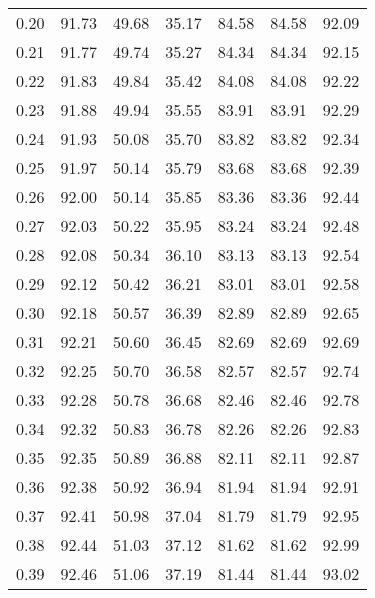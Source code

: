 \begin{tabular}{|c|c|c|c|c|c|c|}
      0.20 &     91.73 &     49.68 &      35.17 &   84.58 &      84.58 &         92.09 \\
      0.21 &     91.77 &     49.74 &      35.27 &   84.34 &      84.34 &         92.15 \\
      0.22 &     91.83 &     49.84 &      35.42 &   84.08 &      84.08 &         92.22 \\
      0.23 &     91.88 &     49.94 &      35.55 &   83.91 &      83.91 &         92.29 \\
      0.24 &     91.93 &     50.08 &      35.70 &   83.82 &      83.82 &         92.34 \\
      0.25 &     91.97 &     50.14 &      35.79 &   83.68 &      83.68 &         92.39 \\
      0.26 &     92.00 &     50.14 &      35.85 &   83.36 &      83.36 &         92.44 \\
      0.27 &     92.03 &     50.22 &      35.95 &   83.24 &      83.24 &         92.48 \\
      0.28 &     92.08 &     50.34 &      36.10 &   83.13 &      83.13 &         92.54 \\
      0.29 &     92.12 &     50.42 &      36.21 &   83.01 &      83.01 &         92.58 \\
      0.30 &     92.18 &     50.57 &      36.39 &   82.89 &      82.89 &         92.65 \\
      0.31 &     92.21 &     50.60 &      36.45 &   82.69 &      82.69 &         92.69 \\
      0.32 &     92.25 &     50.70 &      36.58 &   82.57 &      82.57 &         92.74 \\
      0.33 &     92.28 &     50.78 &      36.68 &   82.46 &      82.46 &         92.78 \\
      0.34 &     92.32 &     50.83 &      36.78 &   82.26 &      82.26 &         92.83 \\
      0.35 &     92.35 &     50.89 &      36.88 &   82.11 &      82.11 &         92.87 \\
      0.36 &     92.38 &     50.92 &      36.94 &   81.94 &      81.94 &         92.91 \\
      0.37 &     92.41 &     50.98 &      37.04 &   81.79 &      81.79 &         92.95 \\
      0.38 &     92.44 &     51.03 &      37.12 &   81.62 &      81.62 &         92.99 \\
      0.39 &     92.46 &     51.06 &      37.19 &   81.44 &      81.44 &         93.02 \\

\end{tabular}
